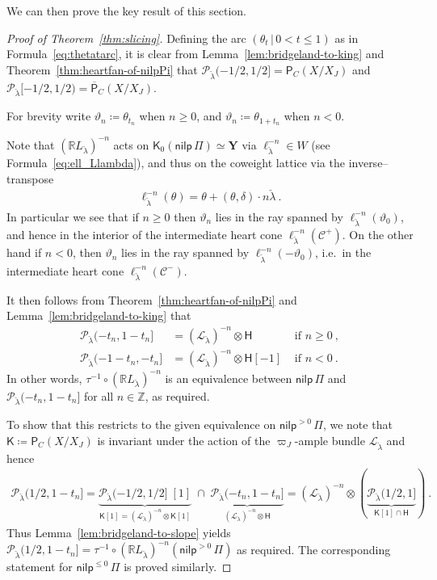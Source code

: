 \documentclass[reqno,a4paper]{amsart}
\newcommand{\calC}{\mathcal{C}}
\newcommand{\calL}{\mathcal{L}}
\newcommand{\calP}{\mathcal{P}}
\newcommand{\R}{\mathbb{R}}
\newcommand{\Z}{\mathbb{Z}}
\newcommand{\sfH}{\mathsf{H}}
\newcommand{\sfK}{\mathsf{K}}
\newcommand{\bfY}{\mathbf{Y}}
\newcommand{\half}{1/2}
\newcommand{\catPC}{\mathsf{P}_{C}}
\newcommand{\barcatPC}{\overline{\mathsf{P}}_{C}}
\newcommand{\nilpPi}{\mathsf{nilp}\, \Pi}
\newcommand{\nilp}{\mathsf{nilp}}
\newcommand{\Llambda}{{\check{\lambda}}}
\newcommand{\rootlattice}{\bfY}
\newcommand{\rsv}{X}
\newcommand{\psv}{X_J}
\theoremstyle{basic-theorem}
\numberwithin{equation}{section}
\begin{document}
We can then prove the key result of this section.
\begin{proof}[Proof of Theorem~\ref{thm:slicing}]
    Defining the arc $(\theta_t\,\vert\, 0<t\leq 1)$ as in Formula~\eqref{eq:thetatarc}, it is clear from Lemma~\ref{lem:bridgeland-to-king} and Theorem~\ref{thm:heartfan-of-nilpPi} that $\calP_\Llambda(-1/2,1/2]=\catPC(\rsv/\psv)$ and $\calP_\Llambda[-1/2,1/2)=\barcatPC(\rsv/\psv)$.

    For brevity write $\vartheta_n\coloneqq\theta_{t_n}$ when $n\geq 0$, and $\vartheta_n\coloneqq \theta_{1+t_n}$ when $n<0$.

	Note that $(\R L_\Llambda)^{-n}$ acts on $\sfK_0(\nilpPi)\simeq \rootlattice$ via $\ell_\Llambda^{-n}\in W$ (see Formula~\eqref{eq:ell_Llambda}), and thus on the coweight lattice via the inverse--transpose
    \begin{align}
		\ell_\Llambda^{-n}(\theta)= \theta + (\theta,\delta)\cdot n\Llambda\ .
	\end{align}
	In particular we see that if $n\geq 0$ then $\vartheta_n$ lies in the ray spanned by $\ell_\Llambda^{-n}(\vartheta_0)$, and hence in the interior of the intermediate heart cone $\ell_\Llambda^{-n}(\calC^+)$. On the other hand if $n<0$, then $\vartheta_n$ lies in the ray spanned by $\ell_{\Llambda}^{-n}(-\vartheta_0)$, i.e.\ in the intermediate heart cone $\ell_\Llambda^{-n}(\calC^-)$.

    It then follows from Theorem~\ref{thm:heartfan-of-nilpPi} and Lemma~\ref{lem:bridgeland-to-king} that
	\begin{align}
        \calP_\Llambda(-t_n,1-t_n]
        &= (\calL_\Llambda)^{-n}\otimes \sfH & \text{ if }n\geq 0\ , \\
        \calP_\Llambda(-1-t_n,-t_n] &=
        (\calL_\Llambda)^{-n}\otimes \sfH[-1] & \text{ if }n<0\ .
	\end{align}
	In other words, $\tau^{-1}\circ(\R L_\Llambda)^{-n}$ is an equivalence between $\nilpPi$ and $\calP_\Llambda(-t_n,1-t_n]$ for all $n\in \Z$, as required.

	To show that this restricts to the given equivalence on $\nilp^{>0}\,\Pi$, we note that $\sfK\coloneqq\catPC(\rsv/\psv)$ is invariant under the action of the $\varpi_J$-ample bundle $\calL_\Llambda$ and hence
	\begin{align}
		\calP_\Llambda (\half,1-t_n] =\underbrace{\calP_\Llambda
        (-\half,\half]\;[1]}_{\sfK[1]=(\calL_\Llambda)^{-n}\otimes \sfK[1]}\;\cap\;
		\underbrace{\calP_\Llambda
        (-t_n,1-t_n]}_{(\calL_\Llambda)^{-n}\otimes\sfH}	=
        (\calL_\Llambda)^{-n}\otimes(\underbrace{\calP_\Llambda(\half,1]}_{\sfK[1]\cap \sfH})\ .
	\end{align}
	Thus Lemma~\ref{lem:bridgeland-to-slope} yields $\calP_\Llambda(\half,1-t_n]=\tau^{-1}\circ (\R L_\Llambda)^{-n}(\nilp^{>0}\,\Pi)$ as required. The corresponding statement for $\nilp^{\leq 0}\,\Pi$ is proved similarly.
\end{proof}
\end{document}
